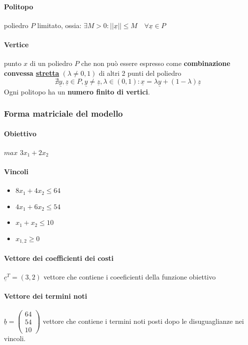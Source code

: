 \documentclass[12pt, twoside, letterpaper]{article}
\newcommand{\vx}[0]{
	\underline{x}
}
\newcommand{\vy}[0]{
	\underline{y}
}
\newcommand{\vz}[0]{
	\underline{z}
}
\begin{document}
			\paragraph{Politopo} poliedro $P$ limitato, ossia: $\exists M > 0: || \vx || \leq M \quad \forall	\vx \in P$
			\paragraph{Vertice} punto $x$ di un poliedro $P$ che non può essere espresso come \textbf{combinazione convessa \underline{stretta}} $(\lambda \ne 0,1)$ di altri 2 punti del poliedro $$\nexists \vy, \vz \in P, \vy \ne \vz, \lambda \in (0,1): \vx = \lambda \vy + (1-\lambda) \vz$$
			Ogni politopo ha un \textbf{numero finito di vertici}.
			
			\subsubsection{Forma matriciale del modello}
				\paragraph{Obiettivo} $max$ $3x_1 + 2x_2$
				\paragraph{Vincoli}
					\begin{itemize}
						\item $8x_1 + 4x_2 \leq 64$
						\item $4x_1 + 6x_2 \leq 54$
						\item $x_1 + x_2 \leq 10$
						\item $x_{1,2} \geq 0$
					\end{itemize}
				\paragraph{Vettore dei coefficienti dei costi} $\underline{c}^T = (3,2) $ vettore che contiene i coeeficienti della funzione obiettivo
				\paragraph{Vettore dei termini noti} 
					$ \underline{b} = \left (\begin{array}{l}
						64\\
						54\\
						10
					\end{array}\right)$ 
					vettore che contiene i termini noti posti dopo le disuguaglianze nei vincoli.
\end{document}
